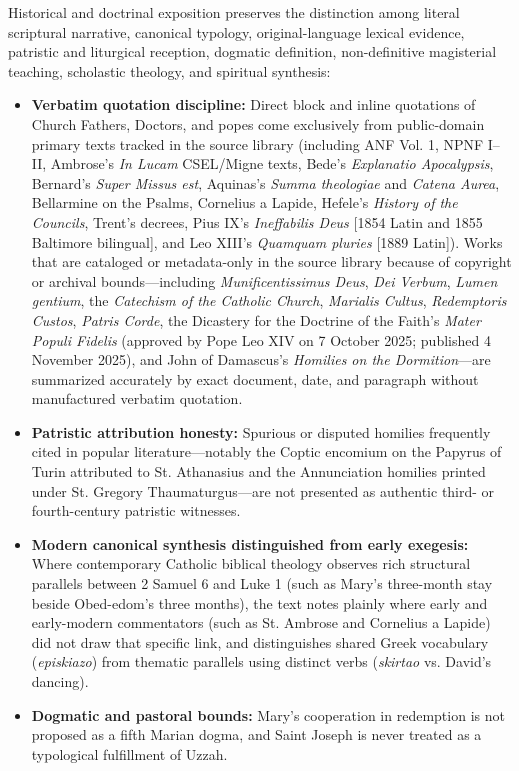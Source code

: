 Historical and doctrinal exposition preserves the distinction among literal scriptural narrative, canonical typology, original-language lexical evidence, patristic and liturgical reception, dogmatic definition, non-definitive magisterial teaching, scholastic theology, and spiritual synthesis:
\begin{itemize}
  \item \textbf{Verbatim quotation discipline:} Direct block and inline quotations of Church Fathers, Doctors, and popes come exclusively from public-domain primary texts tracked in the source library (including ANF Vol. 1, NPNF I--II, Ambrose's \textit{In Lucam} CSEL/Migne texts, Bede's \textit{Explanatio Apocalypsis}, Bernard's \textit{Super Missus est}, Aquinas's \textit{Summa theologiae} and \textit{Catena Aurea}, Bellarmine on the Psalms, Cornelius a Lapide, Hefele's \textit{History of the Councils}, Trent's decrees, Pius IX's \textit{Ineffabilis Deus} [1854 Latin and 1855 Baltimore bilingual], and Leo XIII's \textit{Quamquam pluries} [1889 Latin]). Works that are cataloged or metadata-only in the source library because of copyright or archival bounds---including \textit{Munificentissimus Deus}, \textit{Dei Verbum}, \textit{Lumen gentium}, the \textit{Catechism of the Catholic Church}, \textit{Marialis Cultus}, \textit{Redemptoris Custos}, \textit{Patris Corde}, the Dicastery for the Doctrine of the Faith's \textit{Mater Populi Fidelis} (approved by Pope Leo XIV on 7 October 2025; published 4 November 2025), and John of Damascus's \textit{Homilies on the Dormition}---are summarized accurately by exact document, date, and paragraph without manufactured verbatim quotation.
  \item \textbf{Patristic attribution honesty:} Spurious or disputed homilies frequently cited in popular literature---notably the Coptic encomium on the Papyrus of Turin attributed to St. Athanasius and the Annunciation homilies printed under St. Gregory Thaumaturgus---are not presented as authentic third- or fourth-century patristic witnesses.
  \item \textbf{Modern canonical synthesis distinguished from early exegesis:} Where contemporary Catholic biblical theology observes rich structural parallels between 2 Samuel 6 and Luke 1 (such as Mary's three-month stay beside Obed-edom's three months), the text notes plainly where early and early-modern commentators (such as St. Ambrose and Cornelius a Lapide) did not draw that specific link, and distinguishes shared Greek vocabulary (\textit{episkiazo}) from thematic parallels using distinct verbs (\textit{skirtao} vs. David's dancing).
  \item \textbf{Dogmatic and pastoral bounds:} Mary's cooperation in redemption is not proposed as a fifth Marian dogma, and Saint Joseph is never treated as a typological fulfillment of Uzzah.
\end{itemize}

